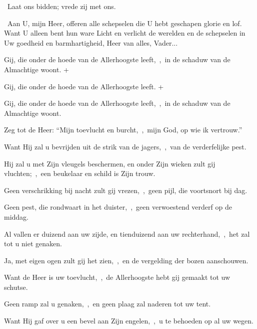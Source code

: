 \documentclass[12pt,twoside,a5paper]{article}
\begin{document}
\begin{halfparskip}
  \dd~Laat ons bidden; vrede zij met ons.

  \cc~Aan U, mijn Heer, offeren alle schepselen die U hebt geschapen glorie en lof. Want U alleen bent hun ware Licht en verlicht de werelden en de schepselen in Uw goedheid en barmhartigheid, Heer van alles, Vader...
\end{halfparskip}

\begin{halfparskip}
     Gij, die onder de hoede van de Allerhoogste leeft,~\sep\ in de schaduw van de Almachtige woont. + 

  \fullline
    Gij, die onder de hoede van de Allerhoogste leeft. + 

  \fullline
   Gij, die onder de hoede van de Allerhoogste leeft,~\sep\ in de schaduw van de Almachtige woont.

  Zeg tot de Heer: ``Mijn toevlucht en burcht,~\sep\ mijn God, op wie ik vertrouw.''

  Want Hij zal u bevrijden uit de strik van de jagers,~\sep\ van de verderfelijke pest.

  Hij zal u met Zijn vleugels beschermen, en onder Zijn wieken zult gij vluchten;~\sep\ een beukelaar en schild is Zijn trouw.

  Geen verschrikking bij nacht zult gij vrezen,~\sep\ geen pijl, die voortsnort bij dag.

  Geen pest, die rondwaart in het duister,~\sep\ geen verwoestend verderf op de middag.

  Al vallen er duizend aan uw zijde, en tienduizend aan uw rechterhand,~\sep\ het zal tot u niet genaken.

  Ja, met eigen ogen zult gij het zien,~\sep\ en de vergelding der bozen aanschouwen.

  Want de Heer is uw toevlucht,~\sep\ de Allerhoogste hebt gij gemaakt tot uw schutse.

  Geen ramp zal u genaken,~\sep\ en geen plaag zal naderen tot uw tent.

  Want Hij gaf over u een bevel aan Zijn engelen,~\sep\ u te behoeden op al uw wegen.


\end{halfparskip}
\end{document}
